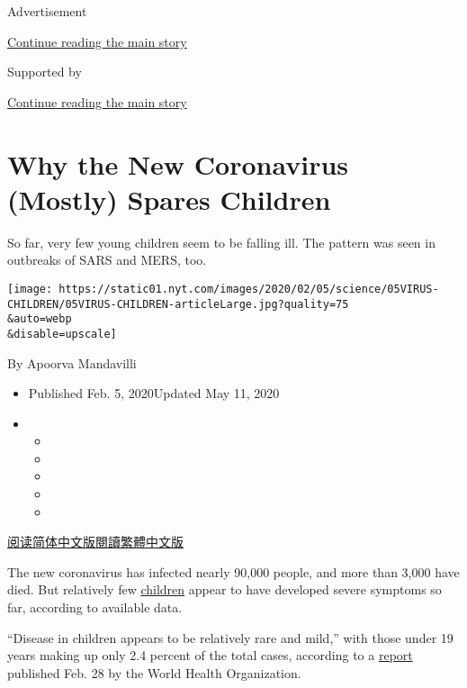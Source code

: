 Advertisement

\protect\hyperlink{after-top}{Continue reading the main story}

Supported by

\protect\hyperlink{after-sponsor}{Continue reading the main story}

\hypertarget{why-the-new-coronavirus-mostly-spares-children}{%
\section{Why the New Coronavirus (Mostly) Spares
Children}\label{why-the-new-coronavirus-mostly-spares-children}}

So far, very few young children seem to be falling ill. The pattern was
seen in outbreaks of SARS and MERS, too.

\texttt{[image: https://static01.nyt.com/images/2020/02/05/science/05VIRUS-CHILDREN/05VIRUS-CHILDREN-articleLarge.jpg?quality=75\\\&auto=webp\\\&disable=upscale]}

By Apoorva Mandavilli

\begin{itemize}
\item
  Published Feb. 5, 2020Updated May 11, 2020
\item
  \begin{itemize}
  \item
  \item
  \item
  \item
  \item
  \end{itemize}
\end{itemize}

\href{https://cn.nytimes.com/health/20200206/coronavirus-children/}{阅读简体中文版}\href{https://cn.nytimes.com/health/20200206/coronavirus-children/zh-hant/}{閱讀繁體中文版}

The new coronavirus has infected nearly 90,000 people, and more than
3,000 have died. But relatively few
\href{https://www.nytimes.com/2020/05/11/health/coronavirus-children-icu.html}{children}
appear to have developed severe symptoms so far, according to available
data.

``Disease in children appears to be relatively rare and mild,'' with
those under 19 years making up only 2.4 percent of the total cases,
according to a
\href{https://www.who.int/docs/default-source/coronaviruse/who-china-joint-mission-on-covid-19-final-report.pdf}{report}
published Feb. 28 by the World Health Organization.

